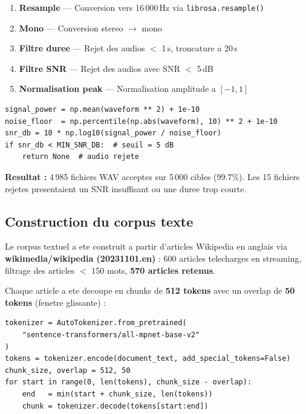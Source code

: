 \documentclass[12pt, a4paper]{article}
\begin{document}
\begin{enumerate}[leftmargin=1.5cm]
  \item \textbf{Resample} --- Conversion vers 16\,000\,Hz via \texttt{librosa.resample()}
  \item \textbf{Mono} --- Conversion stereo $\rightarrow$ mono
  \item \textbf{Filtre duree} --- Rejet des audios $<$ 1\,s, troncature a 20\,s
  \item \textbf{Filtre SNR} --- Rejet des audios avec SNR $<$ 5\,dB
  \item \textbf{Normalisation peak} --- Normalisation amplitude a $[-1, 1]$
\end{enumerate}

\begin{lstlisting}[caption={Estimation du SNR (Signal-to-Noise Ratio)}, label={lst:snr}]
signal_power = np.mean(waveform ** 2) + 1e-10
noise_floor  = np.percentile(np.abs(waveform), 10) ** 2 + 1e-10
snr_db = 10 * np.log10(signal_power / noise_floor)
if snr_db < MIN_SNR_DB:  # seuil = 5 dB
    return None  # audio rejete
\end{lstlisting}

\begin{resultbox}
\textbf{Resultat :} 4\,985 fichiers WAV acceptes sur 5\,000 cibles (99.7\%).
Les 15 fichiers rejetes presentaient un SNR insuffisant ou une duree trop courte.
\end{resultbox}

\subsection{Construction du corpus texte}

Le corpus textuel a ete construit a partir d'articles Wikipedia en anglais via
\textbf{wikimedia/wikipedia (20231101.en)} : 600 articles telecharges en streaming,
filtrage des articles $<$ 150 mots, \textbf{570 articles retenus}.

Chaque article a ete decoupe en chunks de \textbf{512 tokens} avec un overlap de
\textbf{50 tokens} (fenetre glissante) :

\begin{lstlisting}[caption={Pipeline de chunking avec fenetre glissante}]
tokenizer = AutoTokenizer.from_pretrained(
    "sentence-transformers/all-mpnet-base-v2"
)
tokens = tokenizer.encode(document_text, add_special_tokens=False)
chunk_size, overlap = 512, 50
for start in range(0, len(tokens), chunk_size - overlap):
    end   = min(start + chunk_size, len(tokens))
    chunk = tokenizer.decode(tokens[start:end])
\end{lstlisting}
\end{document}
